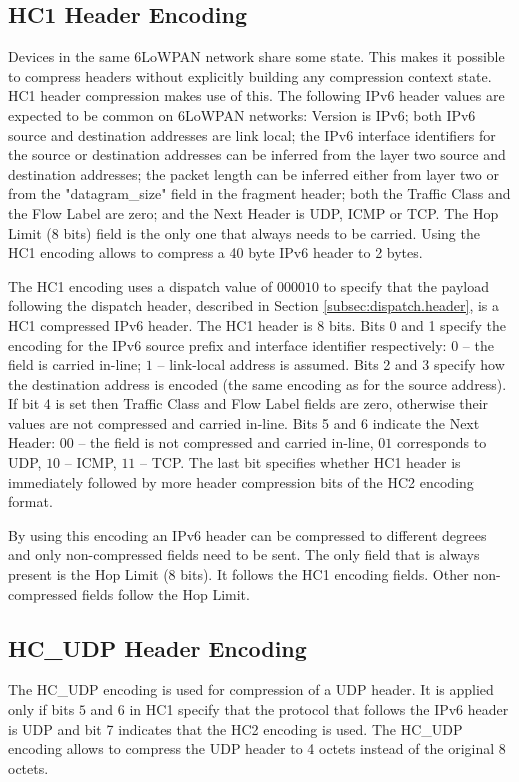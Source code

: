 \documentclass[12pt, titlepage, a4paper]{report}
\begin{document}
\subsection{HC1 Header Encoding}

Devices in the same 6LoWPAN network share some state.  This makes it possible to compress headers without explicitly building any compression context state.  HC1 header compression makes use of this. The following IPv6 header values are expected to be common on 6LoWPAN networks: Version is IPv6; both IPv6 source and destination addresses are link local;  the IPv6 interface identifiers for the source or destination addresses can be inferred from the layer two source and destination addresses; the packet length can be inferred either from layer two or from the "datagram\_size" field in the fragment header; both the Traffic Class and the Flow Label are zero; and the Next Header is UDP, ICMP or TCP. The Hop Limit (8 bits) field is the only one that always needs to be carried. Using the HC1 encoding allows to compress a 40 byte IPv6 header to 2 bytes.

The HC1 encoding uses a dispatch value of $000010$ to specify that the payload following the dispatch header, described in Section \ref{subsec:dispatch.header}, is a HC1 compressed IPv6 header. The HC1 header is 8 bits. Bits 0 and 1 specify the encoding for the IPv6 source prefix and interface identifier respectively: $0$ -- the field is carried in-line; $1$ -- link-local address is assumed. Bits 2 and 3 specify how the destination address is encoded (the same encoding as for the source address). If bit 4 is set then  Traffic Class and Flow Label fields are zero, otherwise their values are not compressed and carried in-line. Bits 5 and 6 indicate the Next Header: $00$ -- the field is not compressed and carried in-line, $01$ corresponds to UDP, $10$ -- ICMP, $11$ -- TCP. The last bit specifies whether HC1 header is immediately followed by more header compression bits of the HC2 encoding format.

By using this encoding an IPv6 header can be compressed to different degrees and only non-compressed fields need to be sent. The only field that is always present is the Hop Limit (8 bits). It follows the HC1 encoding fields. Other non-compressed fields follow the Hop Limit.

\subsection{HC\_UDP Header Encoding}\label{sec:udp.header.enc}
The HC\_UDP encoding is used for compression of a UDP header. It is applied only if bits $5$ and $6$ in HC1 specify that the protocol that follows the IPv6 header is UDP and bit 7 indicates that the HC2 encoding is used. The HC\_UDP encoding allows to compress the UDP header to 4 octets instead of the original 8 octets.
\end{document}
